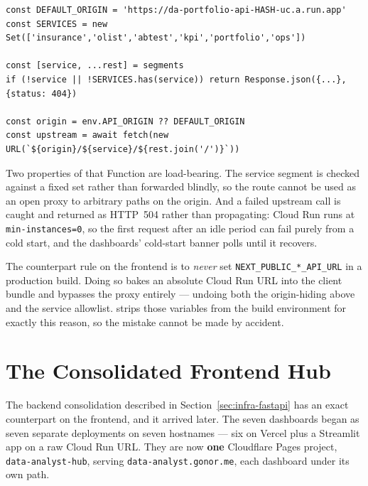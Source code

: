 \begin{lstlisting}[style=typescript, caption={Production proxy -- functions/api/[[path]].ts}]
const DEFAULT_ORIGIN = 'https://da-portfolio-api-HASH-uc.a.run.app'
const SERVICES = new Set(['insurance','olist','abtest','kpi','portfolio','ops'])

const [service, ...rest] = segments
if (!service || !SERVICES.has(service)) return Response.json({...}, {status: 404})

const origin = env.API_ORIGIN ?? DEFAULT_ORIGIN
const upstream = await fetch(new URL(`${origin}/${service}/${rest.join('/')}`))
\end{lstlisting}

Two properties of that Function are load-bearing. The service segment is checked
against a fixed set rather than forwarded blindly, so the route cannot be used as
an open proxy to arbitrary paths on the origin. And a failed upstream call is
caught and returned as HTTP~504 rather than propagating: Cloud Run runs at
\texttt{min-instances=0}, so the first request after an idle period can fail
purely from a cold start, and the dashboards' cold-start banner polls until it
recovers.

\begin{keyinsight}
The counterpart rule on the frontend is to \emph{never} set
\texttt{NEXT\_PUBLIC\_*\_API\_URL} in a production build. Doing so bakes an
absolute Cloud Run URL into the client bundle and bypasses the proxy entirely ---
undoing both the origin-hiding above and the service allowlist.
 strips those variables from the build
environment for exactly this reason, so the mistake cannot be made by accident.
\end{keyinsight}

\section{The Consolidated Frontend Hub}
\label{sec:infra-hub}


The backend consolidation described in Section~\ref{sec:infra-fastapi} has an
exact counterpart on the frontend, and it arrived later. The seven dashboards
began as seven separate deployments on seven hostnames --- six on Vercel plus a
Streamlit app on a raw Cloud Run URL. They are now \textbf{one} Cloudflare Pages
project, \texttt{data-analyst-hub}, serving \texttt{data-analyst.gonor.me}, each
dashboard under its own path.

